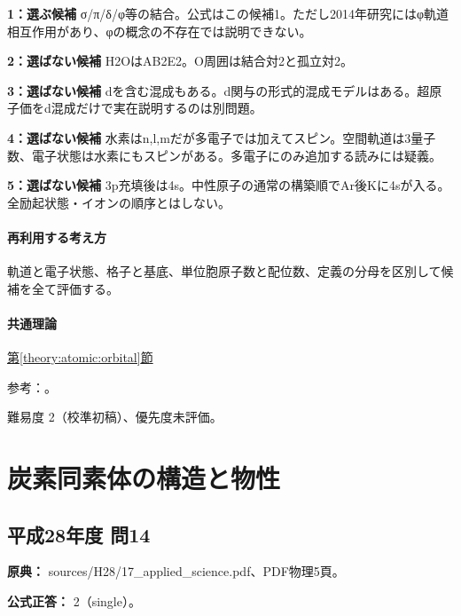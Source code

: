 \noindent\textbf{1：選ぶ候補} σ/π/δ/φ等の結合。公式はこの候補1。ただし2014年研究にはφ軌道相互作用があり、φの概念の不存在では説明できない。\par

\noindent\textbf{2：選ばない候補} H2OはAB2E2。O周囲は結合対2と孤立対2。\par

\noindent\textbf{3：選ばない候補} dを含む混成もある。d関与の形式的混成モデルはある。超原子価をd混成だけで実在説明するのは別問題。\par

\noindent\textbf{4：選ばない候補} 水素はn,l,mだが多電子では加えてスピン。空間軌道は3量子数、電子状態は水素にもスピンがある。多電子にのみ追加する読みには疑義。\par

\noindent\textbf{5：選ばない候補} 3p充填後は4s。中性原子の通常の構築順でAr後Kに4sが入る。全励起状態・イオンの順序とはしない。\par

\paragraph{再利用する考え方} 軌道と電子状態、格子と基底、単位胞原子数と配位数、定義の分母を区別して候補を全て評価する。

\paragraph{共通理論} \hyperref[theory:atomic:orbital]{第\ref*{theory:atomic:orbital}節}

\par 参考：\cite{atomic_quantum,atomic_phi2014}。

\par 難易度 2（校準初稿）、優先度未評価。

\section{炭素同素体の構造と物性}

\subsection{平成28年度 問14}
\label{q:h28-reg-applied-14}

\noindent\textbf{原典：} sources/H28/17\_applied\_science.pdf、PDF物理5頁。

\textbf{公式正答：} 2（single）。

